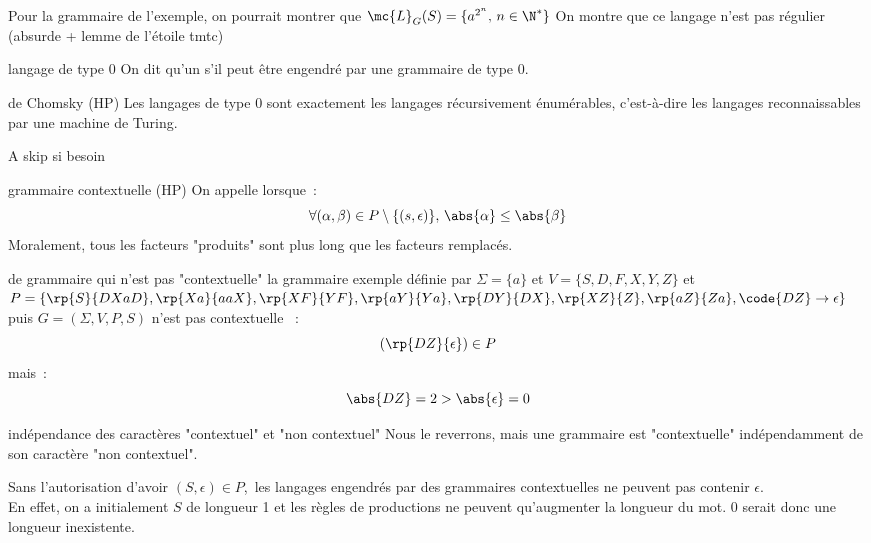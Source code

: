 \begin{adjustwidth}{-3cm}{-3cm}
\begin{exemple}{}{}
    Pour la grammaire de l'exemple, on pourrait montrer que $\mc{L}_G(S) = \{a^{2^n},\, n \in \N^*\}$
    On montre que ce langage n'est pas régulier (absurde + lemme de l'étoile tmtc)
\end{exemple}

\begin{definition}{}{langage de type 0}
    On dit qu'un  s'il peut être engendré par une grammaire de type 0.
\end{definition}

\begin{theoreme}{}{de Chomsky (HP)}
    Les langages de type 0 sont exactement les langages récursivement énumérables, c'est-à-dire les langages reconnaissables par une machine de Turing.
\end{theoreme}

A skip si besoin
\begin{definition}{}{grammaire contextuelle (HP)}
    On appelle  lorsque~:
    $$\forall (\alpha,\beta) \in P \setminus \{(s,\epsilon)\},\, \abs{\alpha} \leq \abs{\beta}$$
    Moralement, tous les facteurs "produits" sont plus long que les facteurs remplacés.
\end{definition}

\begin{exemple}{}{de grammaire qui n'est pas "contextuelle"}
    la grammaire exemple définie par $\Sigma = \{a\}$ et $V = \{S,D,F,X,Y,Z\}$ et $P = \{\rp{S}{DXaD},\rp{Xa}{aaX},\rp{XF}{YF},\rp{aY}{Ya},\rp{DY}{DX},\rp{XZ}{Z},\rp{aZ}{Za},\code{DZ}\to \epsilon\}$ puis $G = (\Sigma, V, P, S)$ n'est pas contextuelle ~:
    $$(\rp{DZ}{\epsilon}) \in P$$
    mais~:
    $$\abs{DZ} = 2 > \abs{\epsilon} = 0$$
\end{exemple}

\begin{remarque}{}{indépendance des caractères "contextuel" et "non contextuel"}
    Nous le reverrons, mais une grammaire est "contextuelle" indépendamment de son caractère "non contextuel".
\end{remarque}

\begin{remarque}{}{}
    Sans l'autorisation d'avoir $(S,\epsilon) \in P$,\, les langages engendrés par des grammaires contextuelles ne peuvent pas contenir $\epsilon$.\\
    En effet, on a initialement $S$ de longueur 1 et les règles de productions ne peuvent qu'augmenter la longueur du mot. 0 serait donc une longueur inexistente.
\end{remarque}


\end{adjustwidth}
